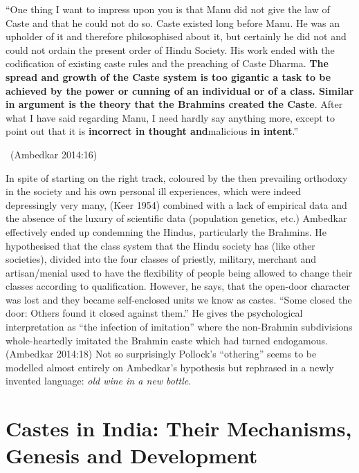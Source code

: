 \begin{myquote}
“One thing I want to impress upon you is that Manu did not give the law of Caste and that he could not do so. Caste existed long before Manu. He was an upholder of it and therefore philosophised about it, but certainly he did not and could not ordain the present order of Hindu Society. His work ended with the codification of existing caste rules and the preaching of Caste Dharma. \textbf{The spread and growth of the Caste system is too gigantic a task to be achieved by the power or cunning of an individual or of a class. Similar in argument is the theory that the Brahmins created the Caste}. After what I have said regarding Manu, I need hardly say anything more, except to point out that it is \textbf{incorrect in thought and}malicious \textbf{in intent}.” 

~\hfill (Ambedkar 2014:16)
\end{myquote}

In spite of starting on the right track, coloured by the then prevailing orthodoxy in the society and his own personal ill experiences, which were indeed depressingly very many, (Keer 1954) combined with a lack of empirical data and the absence of the luxury of scientific data (population genetics, etc.) Ambedkar effectively ended up condemning the Hindus, particularly the Brahmins. He hypothesised that the class system that the Hindu society has (like other societies), divided into the four classes of priestly, military, merchant and artisan/menial used to have the flexibility of people being allowed to change their classes according to qualification. However, he says, that the open-door character was lost and they became self-enclosed units we know as castes. “Some closed the door: Others found it closed against them.” He gives the psychological interpretation as “the infection of imitation” where the non-Brahmin subdivisions whole-heartedly imitated the Brahmin caste which had turned endogamous. (Ambedkar 2014:18) Not so surprisingly Pollock's “othering” seems to be modelled almost entirely on Ambedkar's hypothesis but rephrased in a newly invented language: \textit{old wine in a new bottle}.

\newpage

\section*{Castes in India: Their Mechanisms, Genesis and Development}

